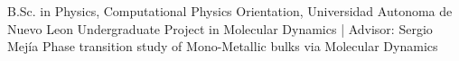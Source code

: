 %
%
%


\begin{scholarship}
					{B.Sc. in Physics, Computational Physics Orientation, Universidad Autonoma de Nuevo Leon}
	\scholarshipentry{}
					{Undergraduate Project in Molecular Dynamics | Advisor: Sergio Mejía}
	\scholarshipentry{}
					{Phase transition study of Mono-Metallic bulks via Molecular Dynamics}

\end{scholarship}